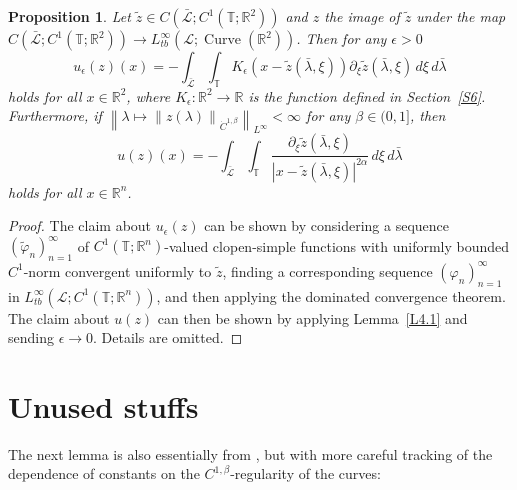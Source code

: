 \documentclass[reqno,centertags,12pt]{amsart}
\newtheorem{proposition}[theorem]{Proposition}
\theoremstyle{definition}
\numberwithin{equation}{section}
\newcommand{\abs}[1]{\left\lvert#1\right\rvert}
\newcommand{\norm}[1]{\left\|#1\right\|}
\newcommand{\seq}[1]{\left( #1 \right)}
\newcommand{\bbR}{{\mathbb{R}}}
\newcommand{\bbT}{{\mathbb{T}}}
\begin{document}
\begin{proposition}\label{PC.10}
    Let $\tilde{z}\in C(\bar{\mathcal{L}};C^{1}(\bbT;\bbR^{2}))$ and $z$ the image of
    $\tilde{z}$ under the map $C(\bar{\mathcal{L}};C^{1}(\bbT;\bbR^{2}))\to
    L_{tb}^{\infty}(\mathcal{L};\operatorname{Curve}(\bbR^{2}))$.
    Then for any $\epsilon>0$
    \[
        u_{\epsilon}(z)(x) = -\int_{\bar{\mathcal{L}}} \int_{\bbT}
        K_{\epsilon}\left(x - \tilde{z}(\bar{\lambda},\xi)\right)
        \partial_{\xi}\tilde{z}(\bar{\lambda},\xi)\,d\xi\,d\bar{\lambda}
    \]
    holds for all $x\in\bbR^{2}$, where $K_{\epsilon}\colon\bbR^{2}\to\bbR$
    is the function defined in Section~\ref{S6}. Furthermore, if
    $\norm{\lambda\mapsto\norm{z(\lambda)}_{\dot{C}^{1,\beta}}}_{L^{\infty}}<\infty$
    for any $\beta\in(0,1]$, then
    \[
        u(z)(x) = -\int_{\bar{\mathcal{L}}} \int_{\bbT}
        \frac{\partial_{\xi}\tilde{z}(\bar{\lambda},\xi)}
        {\abs{x - \tilde{z}(\bar{\lambda},\xi)}^{2\alpha}}
        \,d\xi\,d\bar{\lambda}
    \]
    holds for all $x\in\bbR^{n}$.
\end{proposition}

\begin{proof}
    The claim about $u_{\epsilon}(z)$ can be shown by considering a sequence
    $\seq{\tilde{\varphi}_{n}}_{n=1}^{\infty}$ of $C^{1}(\bbT;\bbR^{n})$-valued
    clopen-simple functions with uniformly bounded $C^{1}$-norm
    convergent uniformly to $\tilde{z}$, finding a corresponding sequence
    $\seq{\varphi_{n}}_{n=1}^{\infty}$ in $L_{tb}^{\infty}(\mathcal{L};C^{1}(\bbT;\bbR^{n}))$,
    and then applying the dominated convergence theorem.
    The claim about $u(z)$ can then be shown by applying
    Lemma~\ref{L4.1} and sending $\epsilon\to 0$.
    Details are omitted.
\end{proof}


\section{Unused stuffs}

The next lemma is also essentially from \cite{JeonZla21}, but with more careful tracking of
the dependence of constants on the $C^{1,\beta}$-regularity of the curves:
\end{document}
